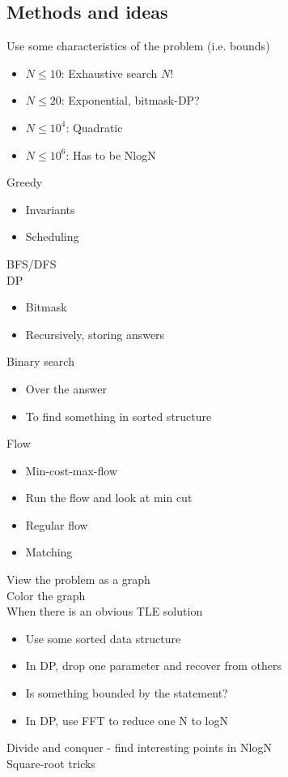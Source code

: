 \documentclass[8pt,a4paper,landscape,oneside]{amsart}
\begin{document}
\begin{multicols*}{2}
\begin{large}
\section{Methods and ideas}
\noindent
Use some characteristics of the problem (i.e. bounds)
\begin{itemize}
  \item $N\leq10$: Exhaustive search $N!$
  \item $N\leq20$: Exponential, bitmask-DP?
  \item $N\leq 10^4$: Quadratic
  \item $N\leq 10^6$: Has to be NlogN
\end{itemize}
Greedy
\begin{itemize}
  \item Invariants
  \item Scheduling
\end{itemize}
BFS/DFS\\
DP
\begin{itemize}
  \item Bitmask
  \item Recursively, storing answers
\end{itemize}
Binary search
\begin{itemize}
  \item Over the answer
  \item To find something in sorted structure
\end{itemize}
Flow
\begin{itemize}
  \item Min-cost-max-flow
  \item Run the flow and look at min cut
  \item Regular flow
  \item Matching
\end{itemize}
View the problem as a graph\\
Color the graph\\
When there is an obvious TLE solution
\begin{itemize}
  \item Use some sorted data structure
  \item In DP, drop one parameter and recover from others
  \item Is something bounded by the statement?
  \item In DP, use FFT to reduce one N to logN
\end{itemize}
Divide and conquer - find interesting points in NlogN\\
Square-root tricks

\end{large}
\end{multicols*}
\end{document}

